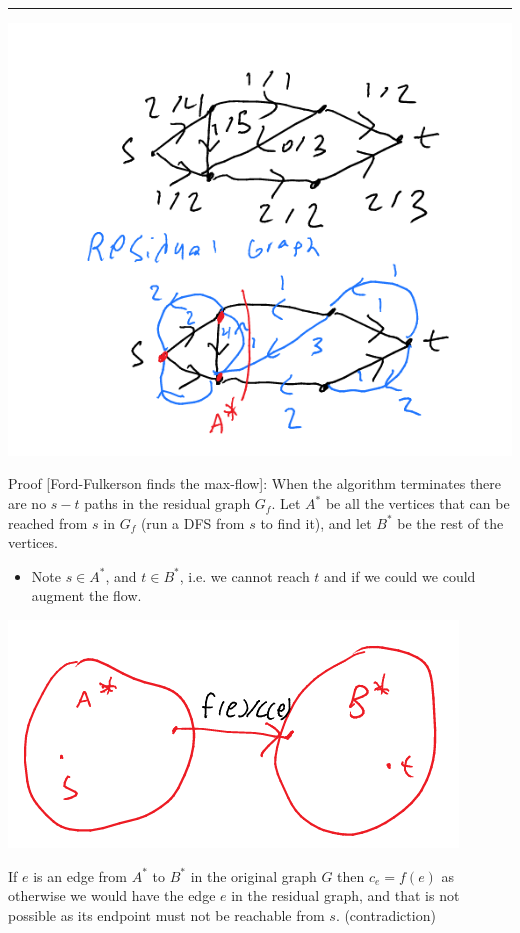 \documentclass[11pt]{article}
\begin{document}
\noindent\rule{\textwidth}{0.5pt}
\begin{center}
\includegraphics[width=.9\linewidth]{./Images/i120.png}
\end{center}
Proof [Ford-Fulkerson finds the max-flow]: When the algorithm terminates there are no \(s-t\) paths in the residual graph \(G_f\). Let \(A^*\) be all the vertices that can be reached from \(s\) in \(G_f\) (run a DFS from \(s\) to find it), and let \(B^*\) be the rest of the vertices.
\begin{itemize}
\item Note \(s\in A^*\), and \(t \in B^*\), i.e. we cannot reach \(t\) and if we could we could augment the flow.
\end{itemize}
\begin{center}
\includegraphics[width=.9\linewidth]{./Images/i121.png}
\end{center}
If \(e\) is an edge from \(A^*\) to \(B^*\) in the original graph \(G\) then \(c_e=f(e)\) as otherwise we would have the edge \(e\) in the residual graph, and that is not possible as its endpoint must not be reachable from \(s\). (contradiction)
\end{document}

